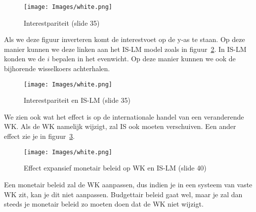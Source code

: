 \begin{figure}[htbp]
	\centering
	\texttt{[image: Images/white.png]}
	\caption{Interestpariteit (slide 35)}
	\label{fig:interestpariteit}
\end{figure}

Als we deze figuur inverteren komt de interestvoet op de y-as te staan. Op deze manier kunnen we deze linken aan het IS-LM model zoals in figuur~\ref{fig:interestpariteitEnISLM}. In IS-LM konden we de $i$ bepalen in het evenwicht. Op deze manier kunnen we ook de bijhorende wisselkoers achterhalen.

\begin{figure}[htbp]
	\centering
	\texttt{[image: Images/white.png]}
	\caption{Interestpariteit en IS-LM (slide 35)}
	\label{fig:interestpariteitEnISLM}
\end{figure}

We zien ook wat het effect is op de internationale handel van een veranderende WK. Als de WK namelijk wijzigt, zal IS ook moeten verschuiven. Een ander effect zie je in figuur~\ref{fig:expansiefMonetair}.

\begin{figure}[htbp]
	\centering
	\texttt{[image: Images/white.png]}
	\caption{Effect expansief monetair beleid op WK en IS-LM (slide 40)}
	\label{fig:expansiefMonetair}
\end{figure}

Een monetair beleid zal de WK aanpassen, dus indien je in een systeem van vaste WK zit, kan je dit niet aanpassen. Budgettair beleid gaat wel, maar je zal dan steeds je monetair beleid zo moeten doen dat de WK niet wijzigt.
